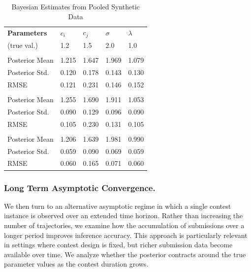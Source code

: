 \documentclass[mnsc]{informs3}
\begin{document}
\begin{table}[htbp]
\centering
\caption{Bayesian Estimates from Pooled Synthetic Data}
\begin{tabularx}{\textwidth}{lYYYY}
\toprule
\textbf{Parameters} & \textbf{$c_i$} & \textbf{$c_j$} & \textbf{$\sigma$} & \textbf{$\lambda$} \\
\addlinespace[0.25ex]
\addlinespace[0.25ex]
(true val.)        & 1.2 & 1.5 & 2.0 & 1.0 \\
\midrule
\addlinespace
{} \\
Posterior Mean    & 1.215 & 1.647 & 1.969 & 1.079 \\
Posterior Std.    & 0.120 & 0.178 & 0.143 & 0.130 \\
RMSE              & 0.121 & 0.231 & 0.146 & 0.152 \\
\addlinespace
{} \\
Posterior Mean    & 1.255 & 1.690 & 1.911 & 1.053 \\
Posterior Std.    & 0.090 & 0.129 & 0.096 & 0.090 \\
RMSE              & 0.105 & 0.230 & 0.131 & 0.105 \\
\addlinespace
{} \\
Posterior Mean    & 1.206 & 1.639 & 1.981 & 0.990 \\
Posterior Std.    & 0.059 & 0.090 & 0.069 & 0.059 \\
RMSE              & 0.060 & 0.165 & 0.071 & 0.060 \\
\bottomrule
\end{tabularx}
\end{table}



\subsubsection{Long Term Asymptotic Convergence.}

We then turn to an alternative asymptotic regime in which a single contest instance is observed over an extended time horizon. 
Rather than increasing the number of trajectories, we examine how the accumulation of submissions over a longer period improves inference accuracy. 
This approach is particularly relevant in settings where contest design is fixed, but richer submission data become available over time. 
We analyze whether the posterior contracts around the true parameter values as the contest duration grows.
\end{document}

